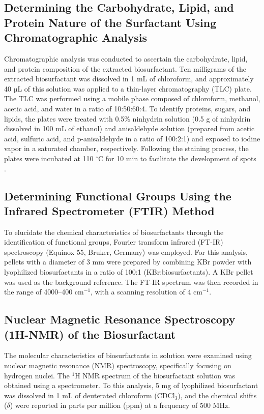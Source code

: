 \documentclass{svjour3}
\begin{document}
\subsection{Determining the Carbohydrate, Lipid, and Protein Nature of the Surfactant Using Chromatographic Analysis}
Chromatographic analysis was conducted to ascertain the carbohydrate, lipid, and protein composition of the extracted biosurfactant. Ten milligrams of the extracted biosurfactant was dissolved in 1 mL of chloroform, and approximately 40 µL of this solution was applied to a thin-layer chromatography (TLC) plate. The TLC was performed using a mobile phase composed of chloroform, methanol, acetic acid, and water in a ratio of 10:50:60:4. To identify proteins, sugars, and lipids, the plates were treated with 0.5\% ninhydrin solution (0.5 g of ninhydrin dissolved in 100 mL of ethanol) and anisaldehyde solution (prepared from acetic acid, sulfuric acid, and p-anisaldehyde in a ratio of 100:2:1) and exposed to iodine vapor in a saturated chamber, respectively. Following the staining process, the plates were incubated at 110 $^\circ$C for 10 min to facilitate the development of spots \cite{32}.
\subsection{Determining Functional Groups Using the Infrared Spectrometer (FTIR) Method}
To elucidate the chemical characteristics of biosurfactants through the identification of functional groups, Fourier transform infrared (FT-IR) spectroscopy (Equinox 55, Bruker, Germany) was employed. For this analysis, pellets with a diameter of 3 mm were prepared by combining KBr powder with lyophilized biosurfactants in a ratio of 100:1 (KBr:biosurfactants). A KBr pellet was used as the background reference. The FT-IR spectrum was then recorded in the range of 4000--400 cm$^{-1}$, with a scanning resolution of 4 cm$^{-1}$.
\subsection{Nuclear Magnetic Resonance Spectroscopy (1H-NMR) of the Biosurfactant}
The molecular characteristics of biosurfactants in solution were examined using nuclear magnetic resonance (NMR) spectroscopy, specifically focusing on hydrogen nuclei. The $^{1}$H NMR spectrum of the biosurfactant solution was obtained using a spectrometer. To this analysis, 5 mg of lyophilized biosurfactant was dissolved in 1 mL of deuterated chloroform (CDCl$_{3}$), and the chemical shifts ($\delta$) were reported in parts per million (ppm) at a frequency of 500 MHz.
\end{document}
